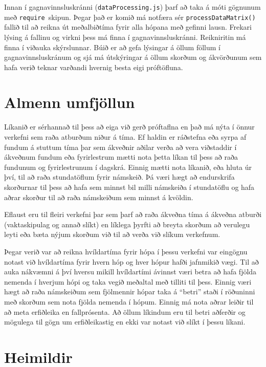 \documentclass[12pt]{article}
\begin{document}
\medskip
Innan í gagnavinnsluskránni (\texttt{dataProcessing.js}) þarf að taka á móti gögnunum með \texttt{require }skipun. Þegar það er komið má notfæra sér \texttt{processDataMatrix()} fallið til að reikna út meðalbiðtíma fyrir alla hópana með gefinni lausn. Frekari lýsing á fallinu og virkni þess má finna í gagnavinnsluskránni.
Reikniritin má finna í viðauka skýrslunnar. Búið er að gefa lýsingar á öllum föllum í gagnavinnsluskránum og sjá má útskýringar á öllum skorðum og ákvörðunum sem hafa verið teknar varðandi hvernig besta eigi próftöfluna.

\newpage

\section{Almenn umfjöllun}

Líkanið er sérhannað til þess að eiga við gerð próftaflna en það má nýta í önnur verkefni sem raða atburðum niður á tíma. Ef haldin er ráðstefna eða syrpa af fundum á stuttum tíma þar sem ákveðnir aðilar verða að vera viðstaddir í ákveðnum fundum eða fyrirlestrum mætti nota þetta líkan til þess að raða fundunum og fyrirlestrunum í dagskrá. Einnig mætti nota líkanið, eða hluta úr því, til að raða stundatöflum fyrir námskeið. Þá væri hægt að endurskrifa skorðurnar til þess að hafa sem minnst bil milli námskeiða í stundatöflu og hafa aðrar skorður til að raða námskeiðum sem minnst á kvöldin.


Eflaust eru til fleiri verkefni þar sem þarf að raða ákveðna tíma á ákveðna atburði (vaktaskipulag og annað slíkt) en líklega þyrfti að breyta skorðum að verulegu leyti eða bæta nýjum skorðum við til að verða við slíkum verkefnum.


\medskip
Þegar verið var að reikna hvíldartíma fyrir hópa í þessu verkefni var eingögnu notast við hvíldartíma fyrir hvern hóp og hver hópur hafði jafnmikið vægi. Til að auka nákvæmni á því hversu mikill hvíldartími ávinnst væri betra að hafa fjölda nemenda í hverjum hópi og taka vegið meðaltal með tilliti til þess. Einnig væri hægt að raða námskeiðum sem fjölmennir hópar taka á “betri” staði í röðuninni með skorðum sem nota fjölda nemenda í hópum. Einnig má nota aðrar leiðir til að meta erfiðleika en fallprósenta. Að öllum líkindum eru til betri aðferðir og mögulega til gögn um erfiðleikastig en ekki var notast við slíkt í þessu líkani.

\section{Heimildir}
\end{document}
